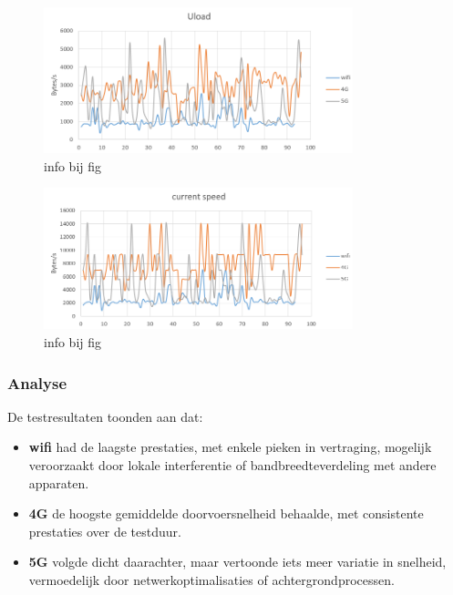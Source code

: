 \begin{figure}

    \includegraphics[width=0.8\textwidth]{../graphics/node-red_uload_grafiek.png}
    \caption[grafiek van uload nodered test]{\label{fig:nodereduload}info bij fig}
\end{figure}
\begin{figure}

    \includegraphics[width=0.8\textwidth]{../graphics/node-red_currentspeed_grafiek.png}
    \caption[grafiek van current speed van nodered test]{\label{fig:noderedcs}info bij fig}
\end{figure}
\subsubsection{Analyse}

De testresultaten toonden aan dat:
\begin{itemize}
    \item \textbf{wifi} had de laagste prestaties, met enkele pieken in vertraging, mogelijk veroorzaakt door lokale interferentie of bandbreedteverdeling met andere apparaten.
    \item \textbf{4G} de hoogste gemiddelde doorvoersnelheid behaalde, met consistente prestaties over de testduur.
    \item \textbf{5G} volgde dicht daarachter, maar vertoonde iets meer variatie in snelheid, vermoedelijk door netwerkoptimalisaties of achtergrondprocessen.
    
\end{itemize}

